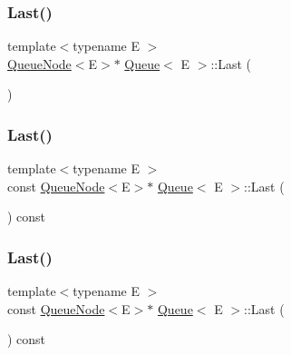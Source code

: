 \mbox{\label{class_queue_a430aca3d3b9f5fd588b215028d134b74}} 
\subsubsection{\texorpdfstring{Last()}{Last()}\hspace{0.1cm}{\footnotesize\ttfamily [4/6]}}
{\footnotesize\ttfamily template$<$typename E $>$ \\
\mbox{\hyperlink{class_queue_node}{Queue\+Node}}$<$E$>$$\ast$ \mbox{\hyperlink{class_queue}{Queue}}$<$ E $>$\+::Last (\begin{DoxyParamCaption}{ }\end{DoxyParamCaption})\hspace{0.3cm}{\ttfamily [inline]}}

\mbox{\label{class_queue_a7c8c2c64700dfe1df8bf266572cf101a}} 
\subsubsection{\texorpdfstring{Last()}{Last()}\hspace{0.1cm}{\footnotesize\ttfamily [5/6]}}
{\footnotesize\ttfamily template$<$typename E $>$ \\
const \mbox{\hyperlink{class_queue_node}{Queue\+Node}}$<$E$>$$\ast$ \mbox{\hyperlink{class_queue}{Queue}}$<$ E $>$\+::Last (\begin{DoxyParamCaption}{ }\end{DoxyParamCaption}) const\hspace{0.3cm}{\ttfamily [inline]}}

\mbox{\label{class_queue_a7c8c2c64700dfe1df8bf266572cf101a}} 
\subsubsection{\texorpdfstring{Last()}{Last()}\hspace{0.1cm}{\footnotesize\ttfamily [6/6]}}
{\footnotesize\ttfamily template$<$typename E $>$ \\
const \mbox{\hyperlink{class_queue_node}{Queue\+Node}}$<$E$>$$\ast$ \mbox{\hyperlink{class_queue}{Queue}}$<$ E $>$\+::Last (\begin{DoxyParamCaption}{ }\end{DoxyParamCaption}) const\hspace{0.3cm}{\ttfamily [inline]}}

